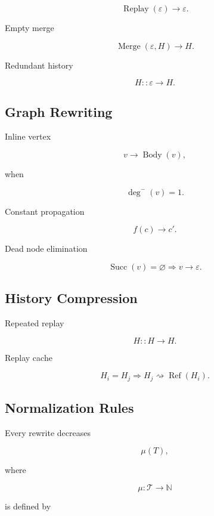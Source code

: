 \documentclass[12pt,oneside]{article}
\theoremstyle{definition}
\theoremstyle{remark}
\begin{document}
\[
\operatorname{Replay}(\varepsilon)
\rightarrow
\varepsilon.
\]

Empty merge

\[
\operatorname{Merge}
(
\varepsilon,
H
)
\rightarrow
H.
\]

Redundant history

\[
H::\varepsilon
\rightarrow
H.
\]

\subsection*{Graph Rewriting}

Inline vertex

\[
v
\rightarrow
\operatorname{Body}(v),
\]

when

\[
\deg^{-}(v)=1.
\]

Constant propagation

\[
f(c)
\rightarrow
c'.
\]

Dead node elimination

\[
\operatorname{Succ}(v)
=
\varnothing
\Longrightarrow
v
\rightarrow
\varepsilon.
\]

\subsection*{History Compression}

Repeated replay

\[
H::H
\rightarrow
H.
\]

Replay cache

\[
H_i
=
H_j
\Longrightarrow
H_j
\rightsquigarrow
\operatorname{Ref}(H_i).
\]

\subsection*{Normalization Rules}

Every rewrite decreases

\[
\mu(T),
\]

where

\[
\mu
:
\mathcal T
\rightarrow
\mathbb N
\]

is defined by
\end{document}
